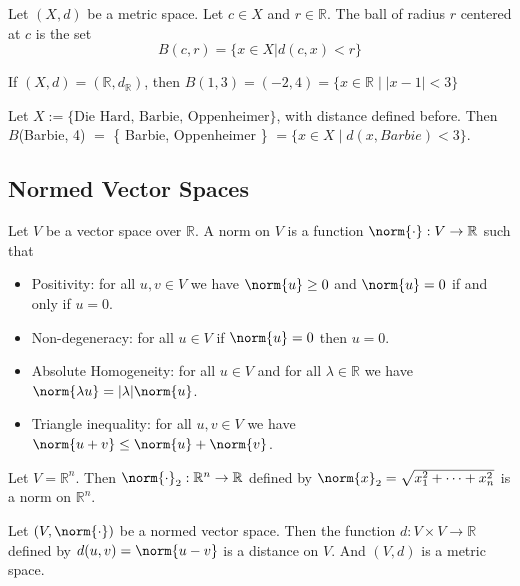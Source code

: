 \begin{definition}
    Let $(X,d)$ be a metric space. Let $c \in X$ and $r \in \mathbb{R}$. The ball of radius $r$ centered at $c$ is the set
    $$ B(c,r) = \{ x \in X | d(c,x) < r \} $$
\end{definition}

\begin{example}
    If $(X,d) = (\mathbb{R}, d_\mathbb{R})$, then $B(1,3) = (-2,4) = \{x \in \mathbb{R} \mid |x-1| < 3\}$
\end{example}

\begin{example}
    Let $X := \{\text{Die Hard, Barbie, Oppenheimer}\}$, with distance defined before. 
    Then $B$(Barbie, 4)  $=$ \{ Barbie, Oppenheimer \} $= \{x \in X \mid d(x, Barbie) < 3\}$.
\end{example}

\subsection{Normed Vector Spaces}

\begin{definition}[norm]
    Let $V$ be a vector space over $\mathbb{R}$. A norm on $V$ is a function
    $\norm{ \cdot }: V \to \mathbb{R}$ such that

    \begin{itemize}
        \item Positivity: for all $u,v \in V$ we have $\norm{ u } \geq 0$ and $\norm{ u } = 0$ if and only if $u = 0$.
        \item Non-degeneracy: for all $u \in V$ if $\norm{ u } = 0$ then $u = 0$.
        \item Absolute Homogeneity: for all $u \in V$ and for all $\lambda \in \mathbb{R}$ we have $\norm{ \lambda u } = |\lambda| \norm{ u }$.
        \item Triangle inequality: for all $u,v \in V$ we have $\norm{ u+v } \leq \norm{ u } + \norm{ v }$.
    \end{itemize}
\end{definition}

\begin{example}
    Let $V = \mathbb{R}^n$. Then $\norm{ \cdot }_2: \mathbb{R}^n \to \mathbb{R}$ defined by $\norm{ x }_2 = \sqrt{x_1^2 + \cdots + x_n^2}$ is a norm on $\mathbb{R}^n$.
\end{example}

\begin{proposition}
    Let $(V, \norm{ \cdot })$ be a normed vector space. 
    Then the function $d: V \times V \to \mathbb{R}$ defined by $d(u,v) = \norm{ u-v }$ is a distance on $V$.
    And $(V,d)$ is a metric space.
\end{proposition}

